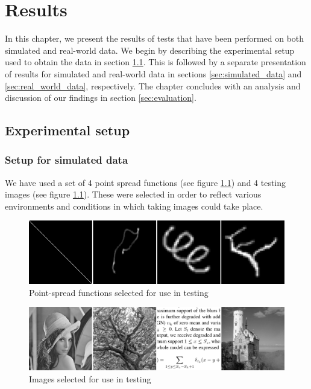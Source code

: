 \documentclass[12pt,notitlepage]{report}
\begin{document}
\chapter{Results}
\label{chap:results}

In this chapter, we present the results of tests that have been performed on both simulated and real-world data. We begin by describing the experimental setup used to obtain the data in section \ref{sec:experimental_setup}. This is followed by a separate presentation of results for simulated and real-world data in sections \ref{sec:simulated_data} and \ref{sec:real_world_data}, respectively. The chapter concludes with an analysis and discussion of our findings in section \ref{sec:evaluation}.

\clearpage

\section{Experimental setup}
\label{sec:experimental_setup}

\subsection{Setup for simulated data}
\label{sec:setup_for_simulated_data}

We have used a set of 4 point spread functions (see figure \ref{fig:used_psfs}) and 4 testing images (see figure \ref{fig:used_psfs}). These were selected in order to reflect various environments and conditions in which taking images could take place. 
\begin{figure}[htb]
 \begin{center}
  \includegraphics[width=12cm]{used_psfs.png}
 \end{center}
 \caption{Point-spread functions selected for use in testing}
 \label{fig:used_psfs}
\end{figure}
\begin{figure}[htb]
 \begin{center}
  \includegraphics[width=12cm]{used_images.png}
 \end{center}
 \caption{Images selected for use in testing}
 \label{fig:used_images}
\end{figure}
\end{document}
